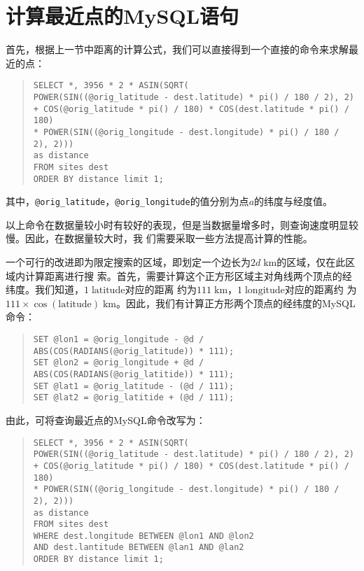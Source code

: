 \section{计算最近点的MySQL语句}
首先，根据上一节中距离的计算公式，我们可以直接得到一个直接的命令来求解最近的点：

\begin{quote}
  \texttt{SELECT *, 3956 * 2 * ASIN(SQRT(\\
    POWER(SIN((@orig\_latitude - dest.latitude) * pi() / 180 / 2), 2)\\
    + COS(@orig\_latitude * pi() / 180) * COS(dest.latitude * pi() / 180)\\
    * POWER(SIN((@orig\_longitude - dest.longitude) * pi() / 180 / 2), 2)))\\
    as distance\\
    FROM sites dest\\
    ORDER BY distance limit 1;}
\end{quote}
其中，\texttt{@orig\_latitude}，\texttt{@orig\_longitude}的值分别为点$a$的纬度与经度值。

以上命令在数据量较小时有较好的表现，但是当数据量增多时，则查询速度明显较慢。因此，在数据量较大时，我
们需要采取一些方法提高计算的性能。

一个可行的改进即为限定搜索的区域，即划定一个边长为$2d\;\mathrm{km}$的区域，仅在此区域内计算距离进行搜
索。首先，需要计算这个正方形区域主对角线两个顶点的经纬度。我们知道，$1\;\mathrm{latitude}$对应的距离
约为$111\;\mathrm{km}$，$1\;\mathrm{longitude}$对应的距离约
为$111\times\cos(\mathrm{latitude})\;\mathrm{km}$。因此，我们有计算正方形两个顶点的经纬度的MySQL命令：
\begin{quote}
  \texttt{SET @lon1 = @orig\_longitude - @d / ABS(COS(RADIANS(@orig\_latitude)) * 111);\\
  SET @lon2 = @orig\_longitude + @d / ABS(COS(RADIANS(@orig\_latitide)) * 111);\\
  SET @lat1 = @orig\_latitude - (@d / 111);\\
  SET @lat2 = @orig\_latitide + (@d / 111);}
\end{quote}

由此，可将查询最近点的MySQL命令改写为：

\begin{quote}
  \texttt{SELECT *, 3956 * 2 * ASIN(SQRT(\\
    POWER(SIN((@orig\_latitude - dest.latitude) * pi() / 180 / 2), 2)\\
    + COS(@orig\_latitude * pi() / 180) * COS(dest.latitude * pi() / 180)\\
    * POWER(SIN((@orig\_longitude - dest.longitude) * pi() / 180 / 2), 2)))\\
    as distance\\
    FROM sites dest\\
    WHERE dest.longitude BETWEEN @lon1 AND @lon2\\
    AND dest.lantitude BETWEEN @lan1 AND @lan2\\
    ORDER BY distance limit 1;}
\end{quote}

